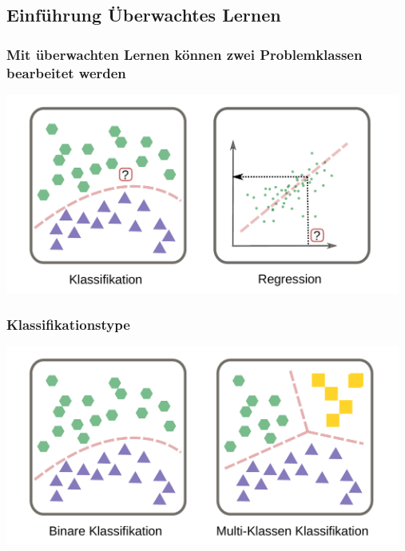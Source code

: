 \documentclass[aspectratio=169]{beamer}
\begin{document}
\subsection{Einführung Überwachtes Lernen}

\setcounter{tocdepth}{2}
\begin{frame}{}
   \tableofcontents[ 
     currentsubsection, 
     hideothersubsections,
     subsectionstyle=show/shaded]
\end{frame}

\begin{frame}
  \frametitle{Mit überwachten Lernen können zwei Problemklassen bearbeitet werden}
  \begin{center}
    \includegraphics[width=13cm]{images/Klassifikation_and_Regression.pdf}
  \end{center}
\end{frame}

\begin{frame}
  \frametitle{Klassifikationstype}
  \begin{center}
    \includegraphics[width=13cm]{images/binary_vs_multi-class_classification.pdf}
  \end{center}  
\end{frame}
\end{document}
